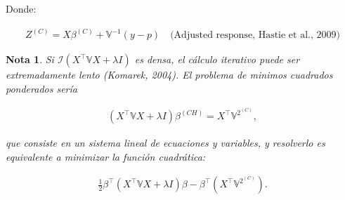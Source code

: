 \documentclass[12pt]{article}
\newtheorem{Note}{Nota}%
\begin{document}
Donde:

\begin{eqnarray}
Z^{(C)} = X \beta^{(C)} + \mathbb{V}^{-1} (y - p)
\quad \text{(Adjusted response, Hastie et al., 2009)}
\end{eqnarray}

\begin{Note}
Si $\mathcal{I}\left( X^\top \mathbb{V} X + \lambda I \right)$ es densa, el cálculo iterativo puede ser extremadamente lento (Komarek, 2004). El problema de minimos cuadrados ponderados ser\'ia

\begin{eqnarray}
\left( X^\top \mathbb{V} X + \lambda I \right) \beta^{(CH)} = X^\top \mathbb{V}^{2^{(C)}},
\end{eqnarray}

que consiste en un sistema lineal de ecuaciones y variables, y resolverlo es equivalente a minimizar la función cuadrática:

\begin{eqnarray}
\frac{1}{2} \beta^\top \left( X^\top \mathbb{V} X + \lambda I \right) \beta - \beta^\top \left( X^\top \mathbb{V}^{2^{(C)}} \right).
\end{eqnarray}
\end{Note}
\end{document}
